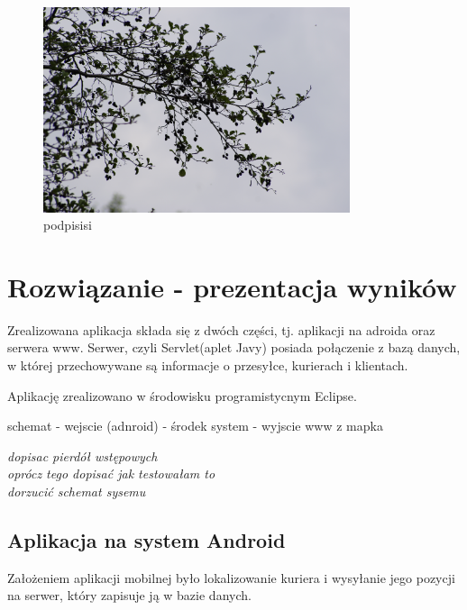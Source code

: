 \documentclass[eng,printmode,oneside]{mgr}
\begin{document}
\begin{figure}[ht!]
\centering
\includegraphics[width=90mm]{obr.jpg}
\caption{podpisisi}
\end{figure}
\chapter{Rozwiązanie - prezentacja wyników}


Zrealizowana aplikacja składa się z dwóch części, tj. aplikacji na adroida oraz
serwera www. Serwer, czyli Servlet(aplet Javy) posiada połączenie z bazą
danych, w której przechowywane są informacje o przesyłce, kurierach i
klientach. 

Aplikację zrealizowano w środowisku programistycnym Eclipse.

schemat - wejscie (adnroid) - środek system - wyjscie www z mapka

\emph{\color{komentarz} dopisac pierdół wstępowych\\oprócz tego dopisać jak
testowałam to\\dorzucić schemat sysemu}
\section{Aplikacja na system Android}

Założeniem aplikacji mobilnej było lokalizowanie kuriera i wysyłanie jego
pozycji na serwer, który zapisuje ją w bazie danych. 
\end{document}
